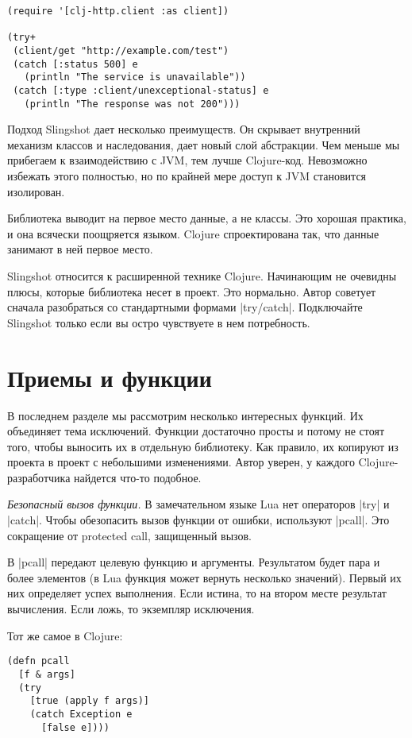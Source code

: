 \begin{verbatim}
(require '[clj-http.client :as client])

(try+
 (client/get "http://example.com/test")
 (catch [:status 500] e
   (println "The service is unavailable"))
 (catch [:type :client/unexceptional-status] e
   (println "The response was not 200")))
\end{verbatim}

Подход Slingshot дает несколько преимуществ. Он скрывает внутренний механизм
классов и наследования, дает новый слой абстракции. Чем меньше мы прибегаем к
взаимодействию с JVM, тем лучше Clojure-код. Невозможно избежать этого
полностью, но по крайней мере доступ к JVM становится изолирован.

Библиотека выводит на первое место данные, а не классы. Это хорошая практика, и
она всячески поощряется языком. Clojure спроектирована так, что данные занимают
в ней первое место.

Slingshot относится к расширенной технике Clojure. Начинающим не очевидны плюсы,
которые библиотека несет в проект. Это нормально. Автор советует сначала
разобраться со стандартными формами \spverb|try/catch|. Подключайте Slingshot только
если вы остро чувствуете в нем потребность.

\section{Приемы и функции}

В последнем разделе мы рассмотрим несколько интересных функций. Их объединяет
тема исключений. Функции достаточно просты и потому не стоят того, чтобы
выносить их в отдельную библиотеку. Как правило, их копируют из проекта в проект
с небольшими изменениями. Автор уверен, у каждого Clojure-разработчика найдется
что-то подобное.

\emph{Безопасный вызов функции.} В замечательном языке Lua нет операторов \spverb|try| и
\spverb|catch|. Чтобы обезопасить вызов функции от ошибки, используют \spverb|pcall|. Это
сокращение от protected call, защищенный вызов.

В \spverb|pcall| передают целевую функцию и аргументы. Результатом будет пара и более
элементов (в Lua функция может вернуть несколько значений). Первый их них
определяет успех выполнения. Если истина, то на втором месте результат
вычисления. Если ложь, то экземпляр исключения.

Тот же самое в Clojure:

\begin{verbatim}
(defn pcall
  [f & args]
  (try
    [true (apply f args)]
    (catch Exception e
      [false e])))
\end{verbatim}

